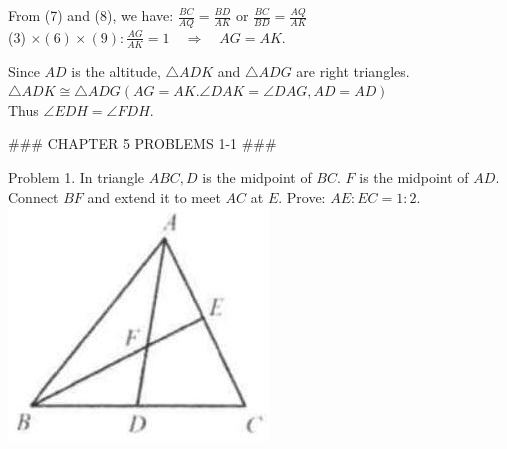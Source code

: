 \documentclass[10pt]{article}
\begin{document}
From (7) and (8), we have: \(\frac{B C}{A Q}=\frac{B D}{A K}\) or \(\frac{B C}{B D}=\frac{A Q}{A K}\)\\
(3) \(\times(6) \times(9): \frac{A G}{A K}=1 \quad \Rightarrow \quad A G=A K\).

Since \(A D\) is the altitude, \(\triangle A D K\) and \(\triangle A D G\) are right triangles.\\
\(\triangle A D K \cong \triangle A D G(A G=A K . \angle D A K=\angle D A G, A D=A D)\)\\
Thus \(\angle E D H=\angle F D H\).


### CHAPTER 5 PROBLEMS 1-1 ###

Problem 1. In triangle \(A B C, D\) is the midpoint of \(B C\). \(F\) is the midpoint of \(A D\). Connect \(B F\) and extend it to meet \(A C\) at \(E\). Prove: \(A E: E C=1: 2\).\\
\includegraphics[max width=\textwidth, center]{2025_04_17_97bc1f7e44d93c271a88g-126(3)}
\end{document}

